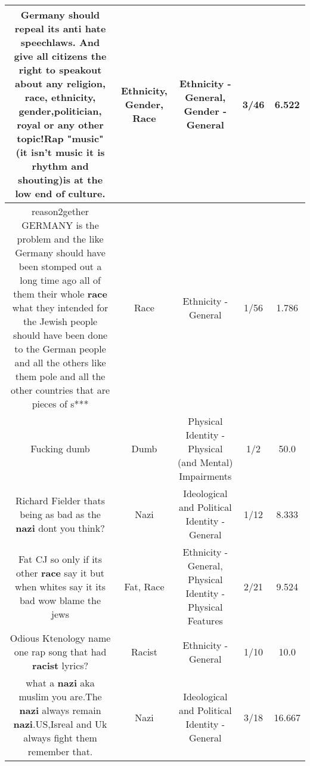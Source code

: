 \documentclass[11pt]{article}
\newlength\mylength
\begin{document}
\begin{center}
\begin{longtable}{|C{.65\mylength}|C{.30\mylength}|C{.12\mylength}|C{.12\mylength}|C{.12\mylength}|}
  \small Germany should repeal its anti hate speechlaws. And give all citizens the right to speakout about any religion, \textbf{race}, \textbf{ethnicity}, \textbf{gender},politician, royal or any other topic!Rap "music" (it isn't music it is rhythm and shouting)is at the low end of culture.\normalsize   & Ethnicity, Gender, Race & Ethnicity - General, Gender - General & 3/46 & 6.522 \\  \hline
  \small reason2gether GERMANY is the problem and the like Germany should have been stomped out a long time ago all of them their whole \textbf{race} what they intended for the Jewish people should have been done to the German people and all the others like them pole and all the other countries that are pieces of s***\normalsize   & Race & Ethnicity - General & 1/56 & 1.786 \\  \hline
  \small Fucking dumb\normalsize   & Dumb & Physical Identity - Physical (and Mental) Impairments & 1/2 & 50.0 \\  \hline
  \small Richard Fielder thats being as bad as the \textbf{nazi} dont you think?\normalsize   & Nazi &  Ideological and Political Identity - General & 1/12 & 8.333 \\  \hline
  \small Fat CJ so only if its  other \textbf{race} say it but when whites say it its bad wow blame the jews\normalsize   & Fat, Race & Ethnicity - General, Physical Identity - Physical Features & 2/21 & 9.524 \\  \hline
  \small Odious Ktenology name one rap song that had \textbf{racist} lyrics?\normalsize   & Racist & Ethnicity - General & 1/10 & 10.0 \\  \hline
  \small what a \textbf{nazi} aka muslim you are.The \textbf{nazi} always remain \textbf{nazi}.US,Isreal and Uk always fight them remember that.\normalsize   & Nazi &  Ideological and Political Identity - General & 3/18 & 16.667 \\  \hline

\end{longtable}
\end{center}
\end{document}

